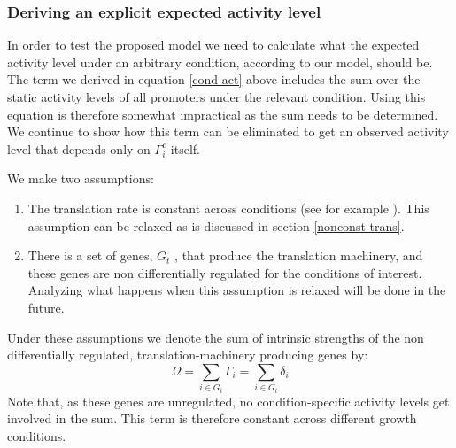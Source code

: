 \documentclass[a4page,notitlepage]{article}
\begin{document}
\subsubsection{Deriving an explicit expected activity level}
In order to test the proposed model we need to calculate what the expected activity level under an arbitrary condition, according to our model, should be.
The term we derived in equation \ref{cond-act} above includes the sum over the static activity levels of all promoters under the relevant condition.
Using this equation is therefore somewhat impractical as the sum needs to be determined.
We continue to show how this term can be eliminated to get an observed activity level that depends only on $\Gamma^c_i$ itself.

We make two assumptions:
\begin{enumerate}
\item The translation rate is constant across conditions (see for example \cite{Neidhardt1999a}).
This assumption can be relaxed as is discussed in section \ref{nonconst-trans}.
\item There is a set of genes, $G_t$ , that produce the translation machinery, and these genes are non differentially regulated for the conditions of interest.
Analyzing what happens when this assumption is relaxed will be done in the future.
\end{enumerate}
Under these assumptions we denote the sum of intrinsic strengths of the non differentially regulated, translation-machinery producing genes by:
\[\Omega=\sum_{i \in G_t}\Gamma_i=\sum_{i \in G_t}\delta_i\]
Note that, as these genes are unregulated, no condition-specific activity levels get involved in the sum.
This term is therefore constant across different growth conditions.
\end{document}
